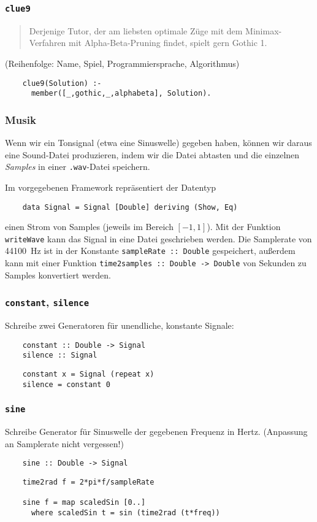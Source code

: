 \documentclass{beamer}
\begin{document}
\begin{frame}[fragile]
  \prolog
  \frametitle{\lstinline{clue9}}
  \begin{quote}
    Derjenige Tutor, der am liebsten optimale Züge mit dem Minimax-Verfahren mit Alpha-Beta-Pruning findet, spielt gern Gothic 1.
  \end{quote}
  \small{(Reihenfolge: Name, Spiel, Programmiersprache, Algorithmus)}
  \pause
  \begin{lstlisting}
    clue9(Solution) :-
      member([_,gothic,_,alphabeta], Solution).
  \end{lstlisting}
\end{frame}

\begin{frame}[fragile]
  \frametitle{Musik}
  Wenn wir ein Tonsignal (etwa eine Sinuswelle) gegeben haben,
  können wir daraus eine Sound-Datei produzieren,
  indem wir die Datei abtasten und die einzelnen \emph{Samples} in einer \texttt{.wav}-Datei speichern.
  
  Im vorgegebenen Framework repräsentiert der Datentyp
  \begin{lstlisting}
    data Signal = Signal [Double] deriving (Show, Eq)
  \end{lstlisting}
  einen Strom von Samples (jeweils im Bereich $[-1,1]$).
  Mit der Funktion \lstinline{writeWave} kann das Signal in eine Datei geschrieben werden.
  Die Samplerate von \SI{44100}{\hertz} ist in der Konstante \lstinline{sampleRate :: Double} gespeichert,
  außerdem kann mit einer Funktion \lstinline{time2samples :: Double -> Double} von Sekunden zu Samples konvertiert werden.
\end{frame}

\begin{frame}[fragile]
  \frametitle{\lstinline{constant}, \lstinline{silence}}
  Schreibe zwei Generatoren für unendliche, konstante Signale:
  \begin{lstlisting}
    constant :: Double -> Signal
    silence :: Signal
  \end{lstlisting}
  \pause
  \begin{lstlisting}
    constant x = Signal (repeat x)
    silence = constant 0
  \end{lstlisting}
\end{frame}

\begin{frame}[fragile]
  \frametitle{\lstinline{sine}}
  Schreibe Generator für Sinuswelle der gegebenen Frequenz in Hertz.
  (Anpassung an Samplerate nicht vergessen!)
  \begin{lstlisting}
    sine :: Double -> Signal
  \end{lstlisting}
  \pause
  \begin{lstlisting}
    time2rad f = 2*pi*f/sampleRate
    
    sine f = map scaledSin [0..]
      where scaledSin t = sin (time2rad (t*freq))
  \end{lstlisting}
\end{frame}
\end{document}
